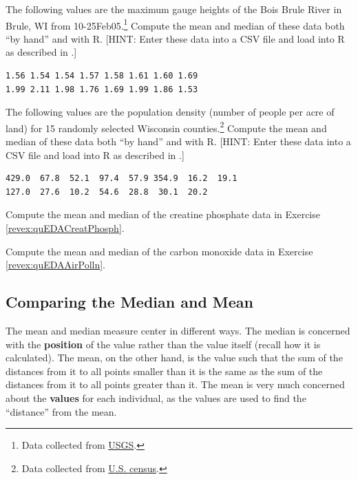\documentclass[10pt,openany]{book}\usepackage[]{graphicx}\usepackage[]{color}
\begin{document}
\begin{exsection}
  \item \label{revex:quEDABrule} \rhw{} The following values are the maximum gauge heights of the Bois Brule River in Brule, WI from 10-25Feb05.\footnote{Data collected from \href{http://waterdata.usgs.gov/wi/nwis/uv?04025500}{USGS}.}  Compute the mean and median of these data both ``by hand'' and with R.  [HINT: Enter these data into a CSV file and load into R as described in .] 
  \begin{Verbatim}[xleftmargin=5mm]
1.56 1.54 1.54 1.57 1.58 1.61 1.60 1.69
1.99 2.11 1.98 1.76 1.69 1.99 1.86 1.53
  \end{Verbatim}

  \item \label{revex:quEDAWIc} \rhw{} The following values are the population density (number of people per acre of land) for 15 randomly selected Wisconsin counties.\footnote{Data collected from \href{http://factfinder.census.gov/}{U.S. census}.}  Compute the mean and median of these data both ``by hand'' and with R.  [HINT: Enter these data into a CSV file and load into R as described in .]
  \begin{Verbatim}[xleftmargin=5mm]
429.0  67.8  52.1  97.4  57.9 354.9  16.2  19.1
127.0  27.6  10.2  54.6  28.8  30.1  20.2
  \end{Verbatim}

  \item \label{revex:quEDACreatPhosph2} \rhw{} Compute the mean and median of the creatine phosphate data in Exercise \ref{revex:quEDACreatPhosph}. 

    \item \label{revex:quEDAAirPolln2} \rhw{} \hspace{12pt} Compute the mean and median of the carbon monoxide data in Exercise \ref{revex:quEDAAirPolln}. 
\end{exsection}

\subsection{Comparing the Median and Mean} \label{sect:MeanMedian}
The mean and median measure center in different ways.  The median is concerned with the \textbf{position} of the value rather than the value itself (recall how it is calculated).  The mean, on the other hand, is the value such that the sum of the distances from it to all points smaller than it is the same as the sum of the distances from it to all points greater than it.  The mean is very much concerned about the \textbf{values} for each individual, as the values are used to find the ``distance'' from the mean.
\end{document}
